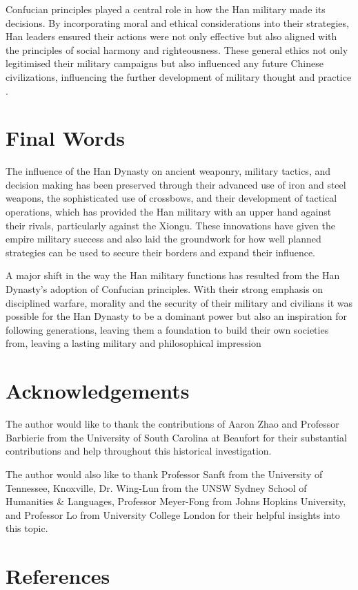 \documentclass{ctexart}
\begin{document}
Confucian principles played a central role in how the Han military made its decisions. By incorporating moral and ethical considerations into their strategies, Han leaders ensured their actions were not only effective but also aligned with the principles of social harmony and righteousness. These general ethics not only legitimised their military campaigns but also influenced any future Chinese civilizations, influencing the further development of military thought and practice \cite{dubs_1938_the}.

\section{Final Words}
The influence of the Han Dynasty on ancient weaponry, military tactics, and decision making has been preserved through their advanced use of iron and steel weapons, the sophisticated use of crossbows, and their development of tactical operations, which has provided the Han military with an upper hand against their rivals, particularly against the Xiongu. These innovations have given the empire military success and also laid the groundwork for how well planned strategies can be used to secure their borders and expand their influence.

A major shift in the way the Han military functions has resulted from the Han Dynasty's adoption of Confucian principles. With their strong emphasis on disciplined warfare, morality and the security of their military and civilians it was possible for the Han Dynasty to be a dominant power but also an inspiration for following generations, leaving them a foundation to build their own societies from, leaving a lasting military and philosophical impression 

\section{Acknowledgements}
The author would like to thank the contributions of Aaron Zhao and Professor Barbierie from the University of South Carolina at Beaufort for their substantial contributions and help throughout this historical investigation.

The author would also like to thank Professor Sanft from the University of Tennessee, Knoxville, Dr. Wing-Lun from the UNSW Sydney School of Humanities \& Languages, Professor Meyer-Fong from Johns Hopkins University, and Professor Lo from University College London for their helpful insights into this topic.


\newpage
\section{References}

\end{document}
